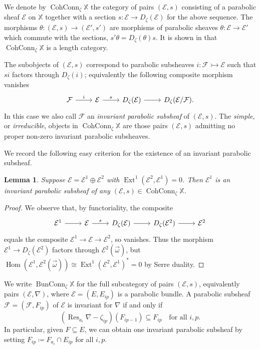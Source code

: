 \documentclass[12pt,a4paper]{amsart}
\theoremstyle{plain}
\newtheorem{lem}[thm]{Lemma}
\DeclareMathOperator{\Hom}{Hom}
\DeclareMathOperator{\Ext}{Ext}
\DeclareMathOperator{\Res}{Res}
\DeclareMathOperator{\BunConn}{BunConn}
\DeclareMathOperator{\CohConn}{CohConn}
\newcommand{\F}{\mathcal F}
\newcommand{\E}{\mathcal E}
\newcommand{\XX}{\mathbb X}
\newcommand{\oom}{\vec{\omega}}
\begin{document}
We denote by $\CohConn_\zeta \XX$ the category of pairs $(\E,s)$ consisting of a parabolic sheaf $\E$ on $\XX$ together with a section $s:\E\to D_\zeta(\E)$ for the above sequence. The morphisms $\theta\colon(\E,s)\to(\E',s')$ are morphisms of parabolic sheaves $\theta\colon\E\to\E'$ which commute with the sections, $s'\theta=D_\zeta(\theta)s$. It is shown in \cite{Hh} that $\CohConn_\zeta\XX$ is a length category.

The subobjects of $(\E,s)$ correspond to parabolic subsheaves $i\colon\F\rightarrowtail\E$ such that $si$ factors through $D_\zeta(i)$; equivalently the following composite morphism vanishes
\[ \begin{tikzcd}
\F \arrow[r,"i"] & \E \arrow[r,"s"] & D_\zeta(\E) \arrow[r] & D_\zeta(\E/\F).
\end{tikzcd}\]
In this case we also call $\F$ an \emph{invariant parabolic subsheaf} of $(\E,s)$. The \emph{simple}, or \emph{irreducible}, objects in $\CohConn_\zeta\XX$ are those pairs $(\E,s)$ admitting no proper non-zero invariant parabolic subsheaves.

We record the following easy criterion for the existence of an invariant parabolic subsheaf.

\begin{lem}
\label{l:dirsumnotirred}
Suppose $\E=\E^1\oplus\E^2$ with $\Ext^1(\E^2,\E^1)=0$. Then $\E^1$ is an invariant parabolic subsheaf of any $(\E,s)\in\CohConn_\zeta\XX$.
\end{lem}

\begin{proof}
We observe that, by functoriality, the composite
\[ \begin{tikzcd}
\E^1 \arrow[r] & \E \arrow[r,"s"] & D_\zeta(\E) \arrow[r] & D_\zeta(\E^2) \arrow[r] & \E^2
\end{tikzcd}\]
equals the composite $\E^1\to\E\to\E^2$, so vanishes. Thus the morphism $\E^1\to D_\zeta(\E^2)$ factors through $\E^2(\oom)$, but $\Hom(\E^1,\E^2(\oom))\cong\Ext^1(\E^2,\E^1)^\ast=0$ by Serre duality.
\end{proof}

We write $\BunConn_\zeta\XX$ for the full subcategory of pairs $(\E,s)$, equivalently pairs $(\E,\nabla)$, where $\E=(E,E_{ip})$ is a parabolic bundle. A parabolic subsheaf $\F=(\F,F_{ip})$ of $\E$ is invariant for $\nabla$ if and only if
\[ (\Res_{a_i}\nabla-\zeta_{ip})(F_{ip-1})\subseteq F_{ip} \quad\textrm{for all }i,p. \]
In particular, given $F\subseteq E$, we can obtain one invariant parabolic subsheaf by setting $F_{ip}\coloneqq F_{a_i}\cap E_{ip}$ for all $i,p$.
\end{document}
